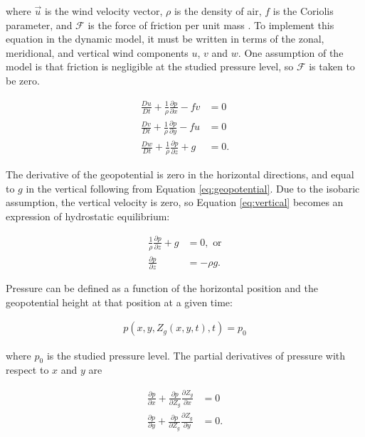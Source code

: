 where $\vec{u}$ is the wind velocity vector, $\rho$ is the density of air, $f$ is the Coriolis parameter, and $\mathcal{F}$ is the force of friction per unit mass \cite{marshall_atmosphere_2008}.
To implement this equation in the dynamic model, it must be written in terms of the zonal, meridional, and vertical wind components $u$, $v$ and $w$.
One assumption of the model is that friction is negligible at the studied pressure level, so $\mathcal{F}$ is taken to be zero.

\begin{align}
    \frac{Du}{Dt} + \frac{1}{\rho} \frac{\partial p}{\partial x} - fv &= 0 \label{eq:u_component} \\
    \frac{Dv}{Dt} + \frac{1}{\rho} \frac{\partial p}{\partial y} - fu &= 0 \label{eq:v_component} \\
    \frac{Dw}{Dt} + \frac{1}{\rho} \frac{\partial p}{\partial z} + g &= 0. \label{eq:vertical}
\end{align}
 
The derivative of the geopotential is zero in the horizontal directions, and equal to $g$ in the vertical following from Equation \ref{eq:geopotential}.
Due to the isobaric assumption, the vertical velocity is zero, so Equation \ref{eq:vertical} becomes an expression of hydrostatic equilibrium:

\begin{align}
    \frac{1}{\rho} \frac{\partial p}{\partial z} + g &= 0, \text{ or} \\
    \frac{\partial p}{\partial z} &= - \rho g. \label{eq:hydrostatic}
\end{align}

Pressure can be defined as a function of the horizontal position and the geopotential height at that position at a given time:

\begin{align}
    p(x, y, Z_g(x, y, t), t) = p_0
\end{align}

where $p_0$ is the studied pressure level.
The partial derivatives of pressure with respect to $x$ and $y$ are

\begin{align}
    \frac{\partial p}{\partial x} + \frac{\partial p}{\partial Z_g} \frac{\partial Z_g}{\partial x} &= 0 \\
    \frac{\partial p}{\partial y} + \frac{\partial p}{\partial Z_g} \frac{\partial Z_g}{\partial y} &= 0.
\end{align}


